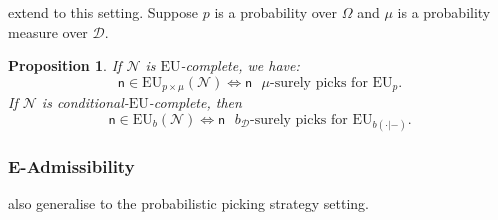 \documentclass[a4paper]{article}
\newtheorem{proposition}[theorem]{Proposition}
\newcommand\EU{\mathrm{EU}}
\newcommand{\D}{\mathcal{D}}
\newcommand{\Decs}{\mathcal{D}}
\newcommand{\n}{\mathsf{n}}
\newcommand\Nu{\mathcal{N}}
\newcommand{\IB}{\mathbb{B}}
\renewcommand{\color}[1]{}
\newenvironment{colored}[1]{\leavevmode\color{#1}}{}
\newenvironment{CCM rewritten}
{\begingroup\color{blue}} %
{\endgroup}              %
\begin{document}
	
	



 extend to this setting.
Suppose $p$ is a probability over $\Omega$ and $\mu$ is a probability measure over $\D$.
\begin{proposition}\label{thm:eu-nu-nec-suff}
If $\Nu$ is $\EU$-complete, we have:
$$\n \in \EU_{p\times \mu}(\Nu) \Leftrightarrow \n \text{ $\mu$-surely picks for $\EU_p$.}$$
If $\Nu$ is conditional-$\EU$-complete, then
$$\n \in \EU_{b}(\Nu) \Leftrightarrow \n \text{ $b_\Decs$-surely picks for $\EU_{b(\cdot|-)}$.}$$
\end{proposition}


\subsubsection{E-Admissibility}
 also generalise to the probabilistic picking strategy setting. 

\end{document}
